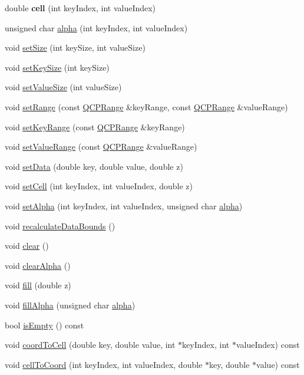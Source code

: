 \begin{DoxyCompactItemize}
double {\bfseries cell} (int key\+Index, int value\+Index)
\item 
unsigned char \hyperlink{classQCPColorMapData_a4f7e6b7a97017400cbbd46f0660e68ea}{alpha} (int key\+Index, int value\+Index)
\item 
void \hyperlink{classQCPColorMapData_a0d9ff35c299d0478b682bfbcdd9c097e}{set\+Size} (int key\+Size, int value\+Size)
\item 
void \hyperlink{classQCPColorMapData_ac7ef70e383aface34b44dbde49234b6b}{set\+Key\+Size} (int key\+Size)
\item 
void \hyperlink{classQCPColorMapData_a0893c9e3914513048b45e3429ffd16f2}{set\+Value\+Size} (int value\+Size)
\item 
void \hyperlink{classQCPColorMapData_aad9c1c7c703c1339489fc730517c83d4}{set\+Range} (const \hyperlink{classQCPRange}{Q\+C\+P\+Range} \&key\+Range, const \hyperlink{classQCPRange}{Q\+C\+P\+Range} \&value\+Range)
\item 
void \hyperlink{classQCPColorMapData_a0738c485f3c9df9ea1241b7a8bb6a86e}{set\+Key\+Range} (const \hyperlink{classQCPRange}{Q\+C\+P\+Range} \&key\+Range)
\item 
void \hyperlink{classQCPColorMapData_ada1b2680ba96a5f4175b6d341cf75d23}{set\+Value\+Range} (const \hyperlink{classQCPRange}{Q\+C\+P\+Range} \&value\+Range)
\item 
void \hyperlink{classQCPColorMapData_afd2083ccfd6987ec94aa7ef8e91ca39a}{set\+Data} (double key, double value, double z)
\item 
void \hyperlink{classQCPColorMapData_a8e75eaf8746596319032a93f3d2d0683}{set\+Cell} (int key\+Index, int value\+Index, double z)
\item 
void \hyperlink{classQCPColorMapData_aaf7de5b34c58f38d8f4c1ceb064a876c}{set\+Alpha} (int key\+Index, int value\+Index, unsigned char \hyperlink{classQCPColorMapData_a4f7e6b7a97017400cbbd46f0660e68ea}{alpha})
\item 
void \hyperlink{classQCPColorMapData_ab235ade8a4d64bd3adb26a99b3dd57ee}{recalculate\+Data\+Bounds} ()
\item 
void \hyperlink{classQCPColorMapData_a9910ba830e96955bd5c8e5bef1e77ef3}{clear} ()
\item 
void \hyperlink{classQCPColorMapData_a14d08b9c3720cd719400079b86d3906b}{clear\+Alpha} ()
\item 
void \hyperlink{classQCPColorMapData_a350f783260eb9b5de5c7b5e0d5d3e3c2}{fill} (double z)
\item 
void \hyperlink{classQCPColorMapData_a93e2a549d7702bc849cd48a585294657}{fill\+Alpha} (unsigned char \hyperlink{classQCPColorMapData_a4f7e6b7a97017400cbbd46f0660e68ea}{alpha})
\item 
bool \hyperlink{classQCPColorMapData_aea88cc75a76ca571acf29b2ba8ac970d}{is\+Empty} () const
\item 
void \hyperlink{classQCPColorMapData_aca5b29e0ca2f299c9060fc6e1f74d0c8}{coord\+To\+Cell} (double key, double value, int $\ast$key\+Index, int $\ast$value\+Index) const
\item 
void \hyperlink{classQCPColorMapData_af1a36385c78ab624cd617065602408b6}{cell\+To\+Coord} (int key\+Index, int value\+Index, double $\ast$key, double $\ast$value) const
\end{DoxyCompactItemize}
